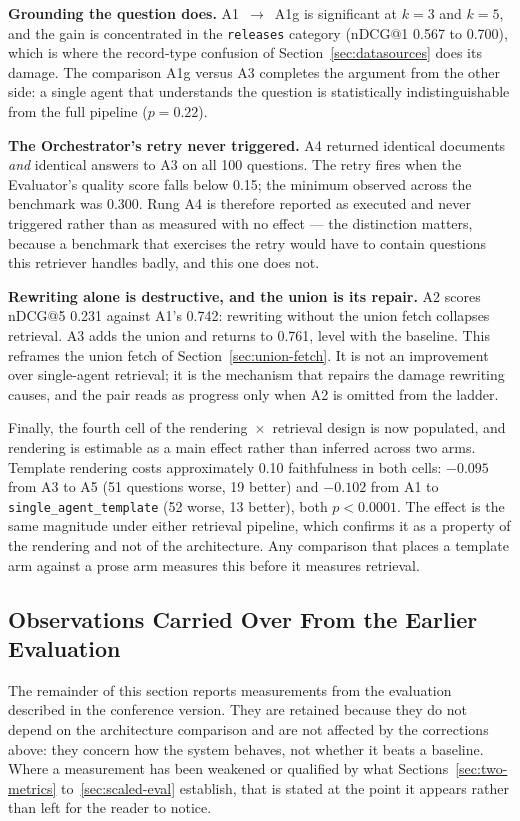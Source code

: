 \documentclass[acmsmall,review,anonymous,screen]{acmart}
\begin{document}
\textbf{Grounding the question does.} A1~$\to$~A1g is significant at $k=3$ and
$k=5$, and the gain is concentrated in the \texttt{releases} category
(nDCG@1 0.567 to 0.700), which is where the record-type confusion of
Section~\ref{sec:datasources} does its damage. The comparison A1g versus A3
completes the argument from the other side: a single agent that understands the
question is statistically indistinguishable from the full pipeline
($p=0.22$).

\textbf{The Orchestrator's retry never triggered.} A4 returned identical
documents \emph{and} identical answers to A3 on all 100 questions. The retry
fires when the Evaluator's quality score falls below 0.15; the minimum observed
across the benchmark was 0.300. Rung A4 is therefore reported as executed and
never triggered rather than as measured with no effect --- the distinction
matters, because a benchmark that exercises the retry would have to contain
questions this retriever handles badly, and this one does not.

\textbf{Rewriting alone is destructive, and the union is its repair.} A2 scores
nDCG@5 0.231 against A1's 0.742: rewriting without the union fetch collapses
retrieval. A3 adds the union and returns to 0.761, level with the baseline.
This reframes the union fetch of Section~\ref{sec:union-fetch}. It is not an
improvement over single-agent retrieval; it is the mechanism that repairs the
damage rewriting causes, and the pair reads as progress only when A2 is omitted
from the ladder.

Finally, the fourth cell of the rendering~$\times$~retrieval design is now
populated, and rendering is estimable as a main effect rather than inferred
across two arms. Template rendering costs approximately 0.10 faithfulness in
both cells: $-0.095$ from A3 to A5 (51 questions worse, 19 better) and $-0.102$
from A1 to \texttt{single\_agent\_template} (52 worse, 13 better), both
$p<0.0001$. The effect is the same magnitude under either retrieval pipeline,
which confirms it as a property of the rendering and not of the architecture.
Any comparison that places a template arm against a prose arm measures this
before it measures retrieval.

\subsection{Observations Carried Over From the Earlier Evaluation}
\label{sec:carried-over}

The remainder of this section reports measurements from the evaluation described
in the conference version. They are retained because they do not depend on the
architecture comparison and are not affected by the corrections above: they
concern how the system behaves, not whether it beats a baseline. Where a
measurement has been weakened or qualified by what Sections~\ref{sec:two-metrics}
to~\ref{sec:scaled-eval} establish, that is stated at the point it appears
rather than left for the reader to notice.
\end{document}

